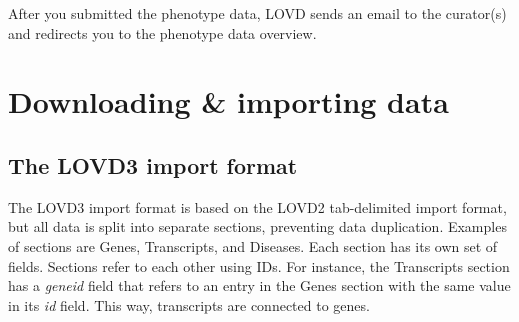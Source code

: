 After you submitted the phenotype data, LOVD sends an email
 to the curator(s) and redirects you to the phenotype data overview.










\chapter{Downloading \& importing data}
\label{chap:download_n_import}
\hypertarget{sec:download_import_format}{}
\section{The LOVD3 import format}
\label{sec:download_import_format}
The LOVD3 import format is based on the LOVD2 tab-delimited import format,
 but all data is split into separate sections, preventing data duplication.
Examples of sections are Genes, Transcripts, and Diseases.
Each section has its own set of fields.
Sections refer to each other using IDs.
For instance, the Transcripts section has a \emph{geneid} field that refers
 to an entry in the Genes section with the same value in its \emph{id} field.
This way, transcripts are connected to genes.


